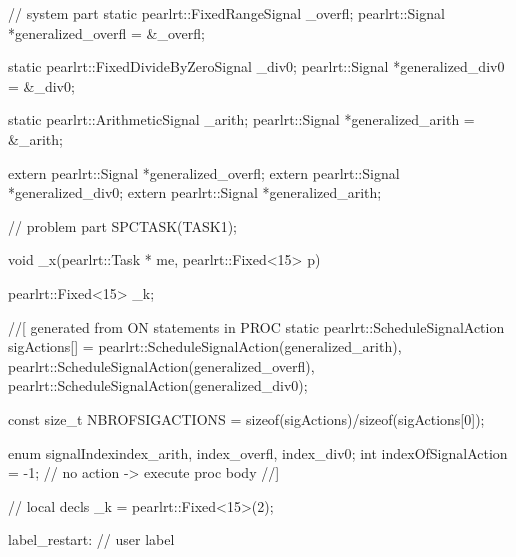 \begin{CppCode}
// system part
static pearlrt::FixedRangeSignal _overfl;
pearlrt::Signal *generalized_overfl = &_overfl;


static pearlrt::FixedDivideByZeroSignal _div0;
pearlrt::Signal *generalized_div0 = &_div0;

static pearlrt::ArithmeticSignal _arith;
pearlrt::Signal *generalized_arith = &_arith;

extern pearlrt::Signal *generalized_overfl;
extern pearlrt::Signal *generalized_div0;
extern pearlrt::Signal *generalized_arith;

// problem part
SPCTASK(TASK1);

void _x(pearlrt::Task * me, pearlrt::Fixed<15> p) {
   pearlrt::Fixed<15> _k;

   //[ generated from ON statements in PROC
   static pearlrt::ScheduleSignalAction sigActions[] = {
		pearlrt::ScheduleSignalAction(generalized_arith),
		pearlrt::ScheduleSignalAction(generalized_overfl),
		pearlrt::ScheduleSignalAction(generalized_div0)};

   const size_t NBROFSIGACTIONS = 
		sizeof(sigActions)/sizeof(sigActions[0]);

   enum signalIndex{index_arith, index_overfl, index_div0};
   int indexOfSignalAction = -1; // no action -> execute proc body
   //]


      // local decls
      _k = pearlrt::Fixed<15>(2);

label_restart:  // user label

}
\end{CppCode}
